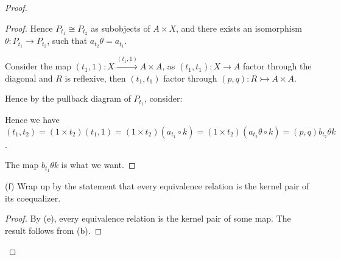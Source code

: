 \documentclass[a4paper]{article}
\begin{document}
\begin{proof}
\begin{proof}
        Hence $P_{t_1}\cong P_{t_2}$ as subobjects of $A\times X$, and there exists an isomorphism $\theta:P_{t_1}\to P_{t_2}$, such that $a_{t_2}\theta = a_{t_1}$. 

        Consider the map $(t_1,1):X\overset{(t_1,1)}\to A\times A$, as $(t_1,t_1):X\to A$ factor through the diagonal and $R$ is reflexive, then $(t_1,t_1)$ factor through $(p,q):R\rightarrowtail A\times A$. 

        Hence by the pullback diagram of $P_{t_1}$, consider:

        \begin{center}
        \end{center}

        Hence we have $(t_1,t_2) = (1\times t_2)(t_1,1) = (1\times t_2)(a_{t_1}\circ k) = (1\times t_2)(a_{t_2}\theta\circ k) = (p,q)b_{t_2}\theta k$.

        The map $b_{t_1}\theta k$ is what we want.
    \end{proof}



    (f) Wrap up by the statement that every equivalence relation is the kernel pair of its coequalizer.

    \begin{proof}
        By (e), every equivalence relation is the kernel pair of some map. The result follows from (b).
    \end{proof}

     



    


    







    
\end{proof}
\end{document}
